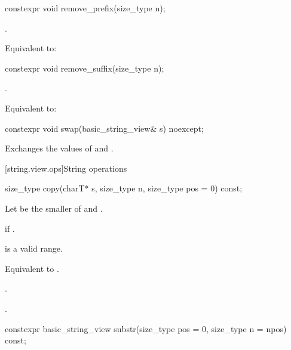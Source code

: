 %
\begin{itemdecl}
constexpr void remove_prefix(size_type n);
\end{itemdecl}

\begin{itemdescr}
\pnum
\requires
{}.

\pnum
\effects
Equivalent to: 
\end{itemdescr}

%
\begin{itemdecl}
constexpr void remove_suffix(size_type n);
\end{itemdecl}

\begin{itemdescr}
\pnum
\requires
{}.

\pnum
\effects
Equivalent to: 
\end{itemdescr}

%
\begin{itemdecl}
constexpr void swap(basic_string_view& s) noexcept;
\end{itemdecl}

\begin{itemdescr}
\pnum
\effects
Exchanges the values of  and .
\end{itemdescr}

[string.view.ops]{String operations}

%
\begin{itemdecl}
size_type copy(charT* s, size_type n, size_type pos = 0) const;
\end{itemdecl}

\begin{itemdescr}
\pnum
Let  be the smaller of  and .

\pnum
\throws
{} if .

\pnum
\requires
{} is a valid range.

\pnum
\effects
Equivalent to .

\pnum
\returns
{}.

\pnum
\complexity
{}.
\end{itemdescr}

%
\begin{itemdecl}
constexpr basic_string_view substr(size_type pos = 0, size_type n = npos) const;
\end{itemdecl}

